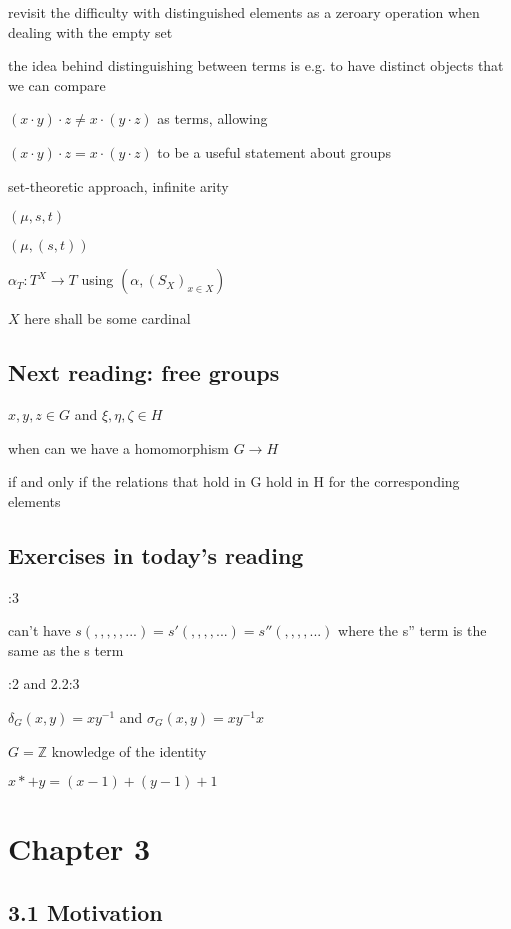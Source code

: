 \documentclass[12pt]{article}
\begin{document}
revisit the difficulty with distinguished elements as a zeroary operation when dealing with the empty set

the idea behind distinguishing between terms is e.g. to have distinct objects that we can compare

$(x \cdot y) \cdot z \neq x \cdot (y \cdot z)$ as terms, allowing

$(x \cdot y) \cdot z = x \cdot (y \cdot z)$ to be a useful statement about groups

\noindent
set-theoretic approach, infinite arity

$(\mu, s, t)$

$(\mu, (s, t))$

$\alpha_T: T^X \to T$ using $(\alpha, (S_X)_{x \in X})$

$X$ here shall be some cardinal

\subsection{Next reading: free groups}

\noindent
$x, y, z \in G$ and $\xi, \eta, \zeta \in H$

when can we have a homomorphism $G \to H$

if and only if the relations that hold in G hold in H for the corresponding elements

\subsection{Exercises in today's reading}

:3

can't have $s( , , , , ,...) = s'( , , , , ...) = s''( , , , , ...)$ where the s'' term is the same as the s term

:2 and 2.2:3

$\delta_G(x, y) = xy^{-1}$ and $\sigma_G(x, y) = xy^{-1}x$

$G = \mathds{Z}$ knowledge of the identity

$x *+ y = (x - 1) + (y - 1) + 1$

\section{Chapter 3}

\subsection{3.1 Motivation}
\end{document}
